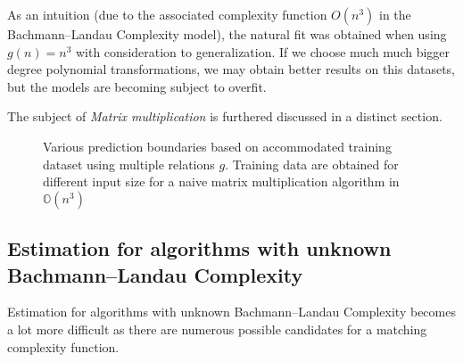 As an intuition (due to the associated complexity function $O(n^3)$ in the Bachmann–Landau Complexity model), the natural fit was obtained when using $g(n) = n^3$ with consideration to generalization. If we choose much much bigger degree polynomial transformations, we may obtain better results on this datasets, but the models are becoming subject to overfit.

The subject of \textit{Matrix multiplication} is furthered discussed in a distinct section.

\begin{figure}[H]
    \caption{Various prediction boundaries based on accommodated training dataset using multiple relations $g$. Training data are obtained for different input size for a naive matrix multiplication algorithm in $\mathbb{O}(n^{3})$}
\end{figure}

\subsection{Estimation for algorithms with unknown Bachmann–Landau Complexity}
Estimation for algorithms with unknown Bachmann–Landau Complexity becomes a lot more difficult as there are numerous possible candidates for a matching complexity function.

